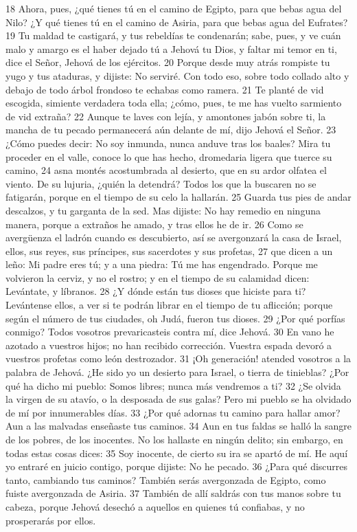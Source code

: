 18 Ahora, pues, ¿qué tienes tú en el camino de Egipto, para que bebas agua del Nilo? ¿Y qué tienes tú en el camino de Asiria, para que bebas agua del Eufrates?
19 Tu maldad te castigará, y tus rebeldías te condenarán; sabe, pues, y ve cuán malo y amargo es el haber dejado tú a Jehová tu Dios, y faltar mi temor en ti, dice el Señor, Jehová de los ejércitos.
20 Porque desde muy atrás rompiste tu yugo y tus ataduras, y dijiste: No serviré. Con todo eso, sobre todo collado alto y debajo de todo árbol frondoso te echabas como ramera.
21 Te planté de vid escogida, simiente verdadera toda ella; ¿cómo, pues, te me has vuelto sarmiento de vid extraña?
22 Aunque te laves con lejía, y amontones jabón sobre ti, la mancha de tu pecado permanecerá aún delante de mí, dijo Jehová el Señor.
23 ¿Cómo puedes decir: No soy inmunda, nunca anduve tras los baales? Mira tu proceder en el valle, conoce lo que has hecho, dromedaria ligera que tuerce su camino,
24 asna montés acostumbrada al desierto, que en su ardor olfatea el viento. De su lujuria, ¿quién la detendrá? Todos los que la buscaren no se fatigarán, porque en el tiempo de su celo la hallarán.
25 Guarda tus pies de andar descalzos, y tu garganta de la sed. Mas dijiste: No hay remedio en ninguna manera, porque a extraños he amado, y tras ellos he de ir.
26 Como se avergüenza el ladrón cuando es descubierto, así se avergonzará la casa de Israel, ellos, sus reyes, sus príncipes, sus sacerdotes y sus profetas,
27 que dicen a un leño: Mi padre eres tú; y a una piedra: Tú me has engendrado. Porque me volvieron la cerviz, y no el rostro; y en el tiempo de su calamidad dicen: Levántate, y líbranos.
28 ¿Y dónde están tus dioses que hiciste para ti? Levántense ellos, a ver si te podrán librar en el tiempo de tu aflicción; porque según el número de tus ciudades, oh Judá, fueron tus dioses.
29 ¿Por qué porfías conmigo? Todos vosotros prevaricasteis contra mí, dice Jehová.
30 En vano he azotado a vuestros hijos; no han recibido corrección. Vuestra espada devoró a vuestros profetas como león destrozador.
31 ¡Oh generación! atended vosotros a la palabra de Jehová. ¿He sido yo un desierto para Israel, o tierra de tinieblas? ¿Por qué ha dicho mi pueblo: Somos libres; nunca más vendremos a ti?
32 ¿Se olvida la virgen de su atavío, o la desposada de sus galas? Pero mi pueblo se ha olvidado de mí por innumerables días.
33 ¿Por qué adornas tu camino para hallar amor? Aun a las malvadas enseñaste tus caminos.
34 Aun en tus faldas se halló la sangre de los pobres, de los inocentes. No los hallaste en ningún delito; sin embargo, en todas estas cosas dices:
35 Soy inocente, de cierto su ira se apartó de mí. He aquí yo entraré en juicio contigo, porque dijiste: No he pecado.
36 ¿Para qué discurres tanto, cambiando tus caminos? También serás avergonzada de Egipto, como fuiste avergonzada de Asiria.
37 También de allí saldrás con tus manos sobre tu cabeza, porque Jehová desechó a aquellos en quienes tú confiabas, y no prosperarás por ellos.

